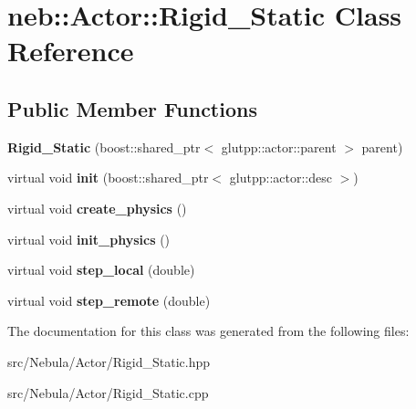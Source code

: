 \hypertarget{classneb_1_1Actor_1_1Rigid__Static}{\section{neb\-:\-:\-Actor\-:\-:\-Rigid\-\_\-\-Static \-Class \-Reference}
\label{classneb_1_1Actor_1_1Rigid__Static}
}
\subsection*{\-Public \-Member \-Functions}
\begin{DoxyCompactItemize}
\item 
\hypertarget{classneb_1_1Actor_1_1Rigid__Static_af50cb5d837b3e222c0171bce9a95131b}{{\bfseries \-Rigid\-\_\-\-Static} (boost\-::shared\-\_\-ptr$<$ glutpp\-::actor\-::parent $>$ parent)}\label{classneb_1_1Actor_1_1Rigid__Static_af50cb5d837b3e222c0171bce9a95131b}

\item 
\hypertarget{classneb_1_1Actor_1_1Rigid__Static_ac20c1721c784026a4ba9fae43a83f25e}{virtual void {\bfseries init} (boost\-::shared\-\_\-ptr$<$ glutpp\-::actor\-::desc $>$)}\label{classneb_1_1Actor_1_1Rigid__Static_ac20c1721c784026a4ba9fae43a83f25e}

\item 
\hypertarget{classneb_1_1Actor_1_1Rigid__Static_ac811bdd9fadf4cdc434ca8696e583f32}{virtual void {\bfseries create\-\_\-physics} ()}\label{classneb_1_1Actor_1_1Rigid__Static_ac811bdd9fadf4cdc434ca8696e583f32}

\item 
\hypertarget{classneb_1_1Actor_1_1Rigid__Static_a21b5c36de8bc1b6d8ac3bf8ccf69c12d}{virtual void {\bfseries init\-\_\-physics} ()}\label{classneb_1_1Actor_1_1Rigid__Static_a21b5c36de8bc1b6d8ac3bf8ccf69c12d}

\item 
\hypertarget{classneb_1_1Actor_1_1Rigid__Static_af8a2758eb88f3e0d8f7faff3d0e536bb}{virtual void {\bfseries step\-\_\-local} (double)}\label{classneb_1_1Actor_1_1Rigid__Static_af8a2758eb88f3e0d8f7faff3d0e536bb}

\item 
\hypertarget{classneb_1_1Actor_1_1Rigid__Static_a1fbb2f59383d23142dc6fcdd8204fafe}{virtual void {\bfseries step\-\_\-remote} (double)}\label{classneb_1_1Actor_1_1Rigid__Static_a1fbb2f59383d23142dc6fcdd8204fafe}

\end{DoxyCompactItemize}


\-The documentation for this class was generated from the following files\-:\begin{DoxyCompactItemize}
\item 
src/\-Nebula/\-Actor/\-Rigid\-\_\-\-Static.\-hpp\item 
src/\-Nebula/\-Actor/\-Rigid\-\_\-\-Static.\-cpp\end{DoxyCompactItemize}
